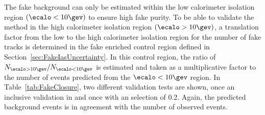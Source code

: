 The fake background can only be estimated within the low calorimeter isolation region $\left(\ecalo<10\gev\right)$ to ensure high fake purity.
To be able to validate the method in the high calorimeter isolation region $\left(\ecalo>10\gev\right)$, a translation factor from the low to the high calorimeter isolation region for the number of fake tracks is determined in the fake enriched control region \fakeCR defined in Section~\ref{sec:FakeIasUncertainty}.
In this control region, the ratio of $N_{\ecalo>10\gev}/N_{\ecalo<10\gev}$ is estimated and taken as a multiplicative factor to the number of events predicted from the $\ecalo<10\gev$ region.
In Table~\ref{tab:FakeClosure}, two different validation tests are shown, once an inclusive validation in \ias and once with an \ias selection of 0.2.
Again, the predicted background events is in agreement with the number of observed events.
\renewcommand{\arraystretch}{1.5}
